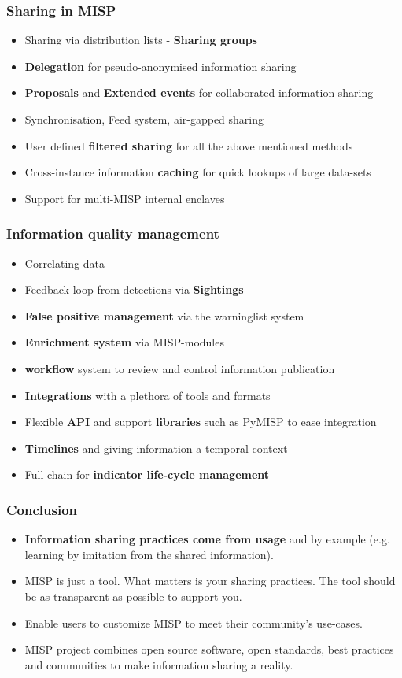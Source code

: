 \begin{frame}
\frametitle{Sharing in MISP}
    \begin{itemize}
        \item Sharing via distribution lists - {\bf Sharing groups}
        \item {\bf Delegation} for pseudo-anonymised information sharing
        \item {\bf Proposals} and {\bf Extended events} for collaborated information sharing
        \item Synchronisation, Feed system, air-gapped sharing
        \item User defined {\bf filtered sharing} for all the above mentioned methods
        \item Cross-instance information {\bf caching} for quick lookups of large data-sets
        \item Support for multi-MISP internal enclaves
    \end{itemize}
\end{frame}


\begin{frame}
\frametitle{Information quality management}
    \begin{itemize}
        \item Correlating data
        \item Feedback loop from detections via {\bf Sightings}
        \item {\bf False positive management} via the warninglist system
        \item {\bf Enrichment system} via MISP-modules
        \item {\bf workflow} system to review and control information publication
        \item {\bf Integrations} with a plethora of tools and formats
        \item Flexible {\bf API} and support {\bf libraries} such as PyMISP to ease integration
        \item {\bf Timelines} and giving information a temporal context
        \item Full chain for {\bf indicator life-cycle management}
    \end{itemize}
\end{frame}

\begin{frame}
        \frametitle{Conclusion}
        \begin{itemize}
                \item {\bf Information sharing practices come from usage} and by example (e.g. learning by imitation from the shared information).
                \item MISP is just a tool. What matters is your sharing practices. The tool should be as transparent as possible to support you.
                \item Enable users to customize MISP to meet their community's use-cases.
                \item MISP project combines open source software, open standards, best practices and communities to make information sharing a reality.
        \end{itemize}
\end{frame}


